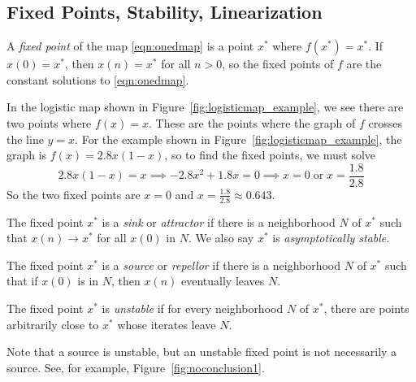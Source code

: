 %
\subsection*{Fixed Points, Stability, Linearization}
A \emph{fixed point} of the map \eqref{eqn:onedmap}
is a point $x^*$ where $f(x^*)=x^*$.
If $x(0)=x^*$, then $x(n)=x^*$ for all $n>0$, so the fixed points
of $f$ are the constant solutions to \eqref{eqn:onedmap}.

In the logistic map shown in Figure~\ref{fig:logisticmap_example},
we see there are two
points where $f(x)=x$.  These are the points
where the graph of $f$ crosses the line $y=x$.
For the example shown in Figure~\ref{fig:logisticmap_example},
the graph is $f(x) = 2.8x(1-x)$, so to find the fixed points,
we must solve
\begin{equation}
  2.8x(1-x) = x \implies -2.8x^2 + 1.8x = 0
  \implies x = 0 \;\textrm{or}\; x = \frac{1.8}{2.8}
\end{equation}
So the two fixed points are $x=0$ and $x=\frac{1.8}{2.8}\approx 0.643$.

\begin{definition}
The fixed point $x^*$ is a \emph{sink} or \emph{attractor}
if there is a neighborhood $N$ of $x^*$ such that
$x(n)\rightarrow x^*$ for all $x(0)$ in $N$.
We also say $x^*$ is \emph{asymptotically stable}.
\end{definition}
\begin{definition}
The fixed point $x^*$ is a \emph{source} or \emph{repellor}
if there is a neighborhood $N$ of $x^*$ such that if $x(0)$
is in $N$, then $x(n)$ eventually leaves $N$.
\end{definition}
\begin{definition}
The fixed point $x^*$ is \emph{unstable} if for every
neighborhood $N$ of $x^*$, there are points arbitrarily close
to $x^*$ whose iterates leave $N$.
\end{definition}

\vspace{0.2cm}
Note that a source is unstable, but an unstable fixed point
is not necessarily a source.  See, for example,
Figure~\ref{fig:noconclusion1}.

